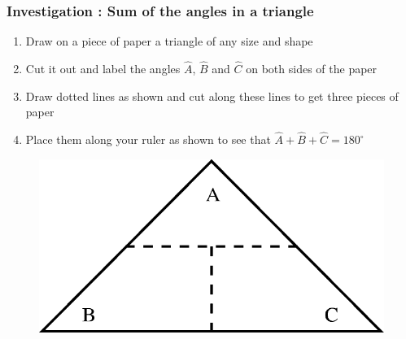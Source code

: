             \subsubsection{  Investigation : Sum of the angles in a triangle }
            \nopagebreak
          \label{m39368*id317720}\begin{enumerate}[noitemsep, label=\textbf{\arabic*}. ] 
            \label{m39368*uid41}\item Draw on a piece of paper a triangle of any size and shape
\label{m39368*uid42}\item Cut it out and label the angles $\hat{A}$, \begin{math}\hat{B}\end{math} and \begin{math}\hat{C}\end{math} on both sides of the paper
\label{m39368*uid43}\item Draw dotted lines as shown and cut along these lines to get three pieces of paper
\label{m39368*uid44}\item Place them along your ruler as shown to see that $\hat{A}+\hat{B}+\hat{C}={180}^{\circ }$\end{enumerate}
          \label{m39368*id317868}
    \setcounter{subfigure}{0}
	\begin{figure}[H] %
    \begin{center}
    \label{m39368*id317874!!!underscore!!!media}\label{m39368*id317874!!!underscore!!!printimage}\includegraphics{col11306.imgs/m39368_MG10C13_027.png} %
      \vspace{2pt}
    \vspace{.1in}
    \end{center}
 \end{figure}       
    \setcounter{subfigure}{0}
